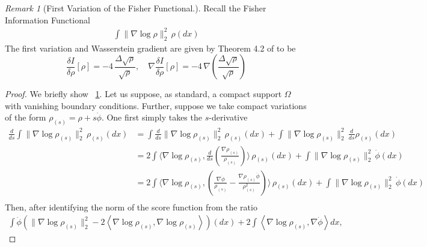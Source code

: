 \documentclass[reqno,11pt,letterpaper]{amsart}
\theoremstyle{plain}
\theoremstyle{definition}
\theoremstyle{remark}
\newtheorem{remark}{Remark}
\begin{document}
\begin{remark}[First Variation of the Fisher Functional.]\label{rem:Fisher_var}
Recall the Fisher Information Functional \cite{Amari2016}
    \begin{align*}
    \int \lVert \nabla \log \rho \rVert_{2}^{2} \,\rho(dx) 
\end{align*}
The first variation and Wasserstein gradient are given by Theorem 4.2 of \cite{Gianazza2008} to be
\begin{equation}\label{eq:fv_fish}
\frac{\delta I}{\delta \rho} [\rho] = -4\, \frac{\Delta \sqrt{ \rho}}{\sqrt{\rho}} , \quad \nabla\frac{\delta I}{\delta \rho} [\rho] = -4\, \nabla \left( \frac{\Delta \sqrt{ \rho}}{\sqrt{\rho}} \right)
\end{equation}
\end{remark}
\begin{proof}\label{proof:fv_fisher}
    We briefly show ~\ref{rem:Fisher_var}. Let us suppose, as standard, a compact support $\Omega$ with vanishing boundary conditions. Further, suppose we take compact variations of the form $\rho_{(s)} = \rho + s \dot{\phi}$. One first simply takes the $s$-derivative
    \begin{align*}
        \frac{d}{ds} \int \lVert \nabla \log{\rho_{(s)}} \rVert_{2}^{2} \,\rho_{(s)}(dx)& =  \int \frac{d}{ds}\lVert \nabla \log{\rho_{(s)}} \rVert_{2}^{2} \,\rho_{(s)}(dx) + \int \lVert \nabla \log{\rho_{(s)}} \rVert_{2}^{2} \,\frac{d}{ds}\rho_{(s)}(dx) \\
        &= 2\int \langle \nabla \log{\rho_{(s)}},  \frac{d}{ds} \left( \frac{\nabla \rho_{(s)}}{\rho_{(s)}} \right)\rangle \,\rho_{(s)}(dx) + \int \lVert \nabla \log{\rho_{(s)}} \rVert_{2}^{2} \,\dot{\phi}(dx) \\
        &= 2\int \langle \nabla \log{\rho_{(s)}},   \left( \frac{\nabla \dot{\phi}}{\rho_{(s)}} - \frac{\nabla \rho_{(s)} \dot{\phi}}{\rho_{(s)}^{2}}\right)\rangle \,\rho_{(s)}(dx) + \int \lVert \nabla \log{\rho_{(s)}} \rVert_{2}^{2} \,\dot{\phi}(dx) \\
        \end{align*}
        Then, after identifying the norm of the score function from the ratio
        \begin{align*}
         \int \dot{\phi} \left(
        \lVert \nabla \log \rho_{(s)} \rVert_{2}^{2}  -
        2 \left\langle \nabla \log \rho_{(s)}, \nabla \log \rho_{(s)}
        \right\rangle \right)(dx) + 2\int \left\langle \nabla \log \rho_{(s)}, \nabla \dot{\phi} \right\rangle dx, \end{align*}

\end{proof}
\end{document}
